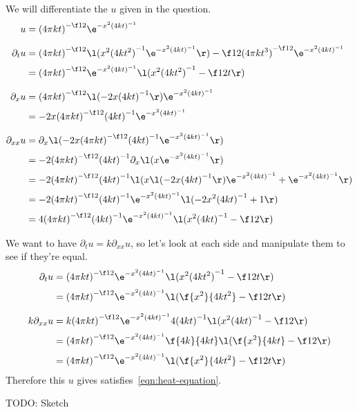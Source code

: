 \documentclass[a4paper]{article}
\begin{document}
We will differentiate the $u$ given in the question.
\begin{align*}
u &= {(4\pi kt)}^{-\f12} \e^{-x^2 {(4kt)}^{-1}} \\[1.5ex]
%
\partial_t u &= {(4\pi kt)}^{-\f12} \l( x^2 {(4k t^2)}^{-1} \e^{-x^2 {(4kt)}^{-1}} \r)
    - \f12 {(4\pi k t^3)}^{-\f12} \e^{-x^2 {(4kt)}^{-1}} \\[0.5ex]
&= {(4\pi kt)}^{-\f12} \e^{-x^2 {(4kt)}^{-1}} \l(
    x^2 {(4k t^2)}^{-1} - \f1{2t}
\r) \\[1.5ex]
%
\partial_x u &= {(4\pi kt)}^{-\f12} \l( -2x {(4kt)}^{-1} \r) \e^{-x^2 {(4kt)}^{-1}} \\[0.5ex]
&= -2x {(4\pi kt)}^{-\f12} {(4kt)}^{-1} \e^{-x^2 {(4kt)}^{-1}} \\[1.5ex]
%
\partial_{xx} u &= \partial_x \l( -2x {(4\pi kt)}^{-\f12} {(4kt)}^{-1} \e^{-x^2 {(4kt)}^{-1}} \r) \\[0.5ex]
&= -2 {(4\pi kt)}^{-\f12} {(4kt)}^{-1} \partial_x \l( x \e^{-x^2 {(4kt)}^{-1}} \r) \\[0.5ex]
&= -2 {(4\pi kt)}^{-\f12} {(4kt)}^{-1} \l(
    x \l( -2x {(4kt)}^{-1} \r) \e^{-x^2 {(4kt)}^{-1}}
    + \e^{-x^2 {(4kt)}^{-1}}
\r) \\[0.5ex]
&= -2 {(4\pi kt)}^{-\f12} {(4kt)}^{-1} \e^{-x^2 {(4kt)}^{-1}} \l( -2x^2 {(4kt)}^{-1} + 1 \r) \\[0.5ex]
&= 4 {(4\pi kt)}^{-\f12} {(4kt)}^{-1} \e^{-x^2 {(4kt)}^{-1}} \l( x^2 {(4kt)}^{-1} - \f12 \r)
\end{align*}

We want to have $\partial_t u = k \partial_{xx} u$, so let's look at each side and manipulate them to see if they're equal.
\begin{align*}
\partial_t u &= {(4\pi kt)}^{-\f12} \e^{-x^2 {(4kt)}^{-1}} \l(
    x^2 {(4k t^2)}^{-1} - \f1{2t}
\r) \\[0.5ex]
&= {(4\pi kt)}^{-\f12} \e^{-x^2 {(4kt)}^{-1}} \l(
    \f{x^2}{4k t^2} - \f1{2t}
\r) \\[1.5ex]
%
k \partial_{xx} u &= k {(4\pi kt)}^{-\f12} \e^{-x^2 {(4kt)}^{-1}} 4 {(4kt)}^{-1} \l(
    x^2 {(4kt)}^{-1} - \f12
\r) \\[0.5ex]
&= {(4\pi kt)}^{-\f12} \e^{-x^2 {(4kt)}^{-1}} \f{4k}{4kt} \l(
    \f{x^2}{4kt} - \f12
\r) \\[0.5ex]
&= {(4\pi kt)}^{-\f12} \e^{-x^2 {(4kt)}^{-1}} \l(
    \f{x^2}{4kt^2} - \f1{2t}
\r)
\end{align*}
Therefore this $u$ gives satisfies~\eqref{eqn:heat-equation}.

TODO: Sketch
\end{document}
